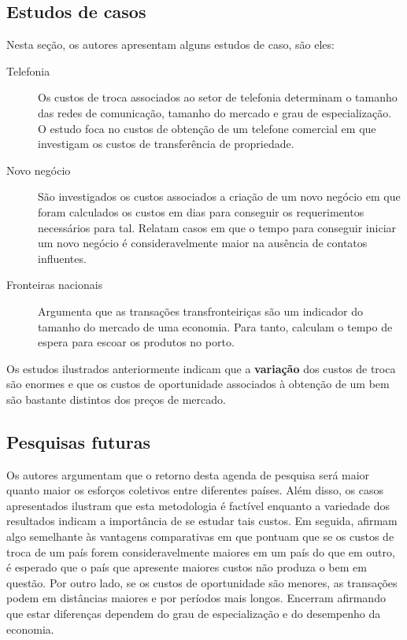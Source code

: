 \subsection*{Estudos de casos}

Nesta seção, os autores apresentam alguns estudos de caso, são eles:

\begin{description}
	\item[Telefonia] Os custos de troca associados ao setor de telefonia determinam o tamanho das redes de comunicação, tamanho do mercado e grau de especialização. O estudo foca no custos de obtenção de um telefone comercial em que investigam os custos de transferência de propriedade.
	\item[Novo negócio] São investigados os custos associados a criação de um novo negócio em que foram calculados os custos em dias para conseguir os requerimentos necessários para tal. Relatam casos em que o tempo para conseguir iniciar um novo negócio é consideravelmente maior na ausência de contatos influentes.
	\item[Fronteiras nacionais] Argumenta que as transações transfronteiriças são um indicador do tamanho do mercado de uma economia. Para tanto, calculam o tempo de espera para escoar os produtos no porto.
\end{description}
Os estudos ilustrados anteriormente indicam que a \textbf{variação} dos custos de troca são enormes e que os custos de oportunidade associados à obtenção de um bem são bastante distintos dos preços de mercado.

\subsection*{Pesquisas futuras}

Os autores argumentam que o retorno desta agenda de pesquisa será maior quanto maior os esforços coletivos entre diferentes países. Além disso, os casos apresentados ilustram que esta metodologia é factível enquanto a variedade dos resultados indicam a importância de se estudar tais custos. Em seguida, afirmam algo semelhante às vantagens comparativas em que pontuam que se os custos de troca de um país forem consideravelmente maiores em um país do que em outro, é esperado que o país que apresente maiores custos não produza o bem em questão. Por outro lado, se os custos de oportunidade são menores, as transações podem em distâncias maiores e por períodos mais longos. Encerram afirmando que estar diferenças dependem do grau de especialização e do desempenho da economia.